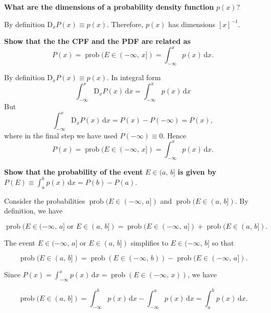 \documentclass[11pt]{article}
\begin{document}
\textbf{What are the dimensions of a probability density function} \(p(x)\)?

By definition \(\mathrm{D}_{x} P(x) \equiv p(x)\). Therefore, \(p(x)\) has dimensions \([x]^{-1}\).

\label{sec:orgd8fa8aa}

\textbf{Show that the the CPF and the PDF are related as}
\[
P(x)=\operatorname{prob}(E \in (-\infty,\,x]) = \int_{-\infty}^{x} p(x) \, \mathrm{d}x.
\]

By definition \(\mathrm{D}_{x} P(x) \equiv p(x)\). In integral form
\[
\int_{-\infty}^{x} \mathrm{D}_{x} P(x) \, \mathrm{d}x = \int_{-\infty}^{x} p(x) \, \mathrm{d}x
\]
But
\[
\int_{-\infty}^{x} \mathrm{D}_{x} P(x) \, \mathrm{d}x = P(x) - P(-\infty) = P(x),
\]
where in the final step we have used \(P(-\infty) \equiv 0\). Hence
\[
P(x)=\operatorname{prob}(E \in (-\infty,\,x]) = \int_{-\infty}^{x} p(x) \, \mathrm{d}x.
\]
\label{sec:org889c699}

\textbf{Show that the probability of the event} \(E \in (a, \, b]\) \textbf{is given by} \(P(E) \equiv \int_{a}^{b} p(x)\, \mathrm{d}x = P(b) - P(a)\).


Consider the probabilities \(\operatorname{prob}(E \in (-\infty, \, a])\) and \(\operatorname{prob}(E \in (a, \, b])\). By definition, we have 

\[
\operatorname{prob} (E \in (-\infty, \, a] \text{ or } E \in (a, \, b]) = \operatorname{prob}(E \in (-\infty, \, a]) + \operatorname{prob}(E \in (a, \, b]).
\]

The event \(E \in (-\infty, \, a] \text{ or } E \in (a, \, b])\) simplifies to \(E \in (-\infty, \, b]\) so that 

\[
\operatorname{prob}(E \in (a, \, b]) = \operatorname{prob} (E \in (-\infty, \, b)) - \operatorname{prob}(E \in (-\infty, \, a]).
\]

Since \(P(x) = \int_{-\infty}^{x} p(x) \, \mathrm{d}x = \operatorname{prob} (E \in (-\infty, \, x))\), we have

\[
\operatorname{prob}(E \in (a, \, b]) = \int_{-\infty}^{b} p(x) \, \mathrm{d}x - \int_{-\infty}^{a} p(x) \, \mathrm{d}x = \int_{a}^{b} p(x) \, \mathrm{d}x.
\]
\end{document}
